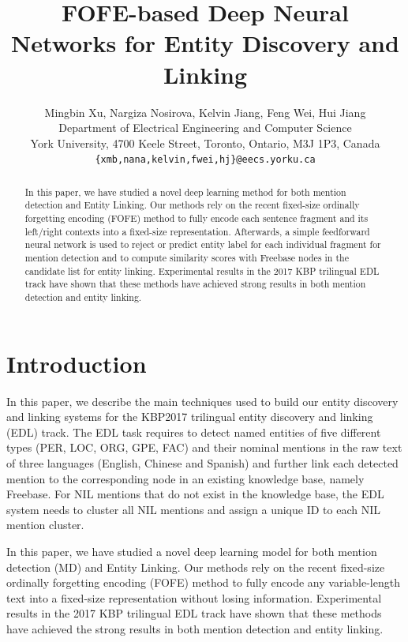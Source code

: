 \documentclass[11pt]{article}
\title{FOFE-based Deep Neural Networks for Entity Discovery and Linking}
\author{Mingbin Xu, Nargiza Nosirova, Kelvin Jiang, Feng Wei, Hui Jiang \\
	Department of Electrical Engineering and Computer Science \\
	York University,  4700 Keele Street, Toronto, Ontario, M3J 1P3, Canada\\
	{\tt \{xmb,nana,kelvin,fwei,hj\}@eecs.yorku.ca}
}
\date{}
\begin{document}
\maketitle

\begin{abstract}
In this paper, we have studied a novel deep learning method for both mention detection and Entity Linking. Our methods rely on the recent fixed-size ordinally forgetting encoding (FOFE) method to fully encode each sentence fragment and its left/right contexts into a fixed-size representation. Afterwards, a simple feedforward neural network is used to reject or predict entity label for each individual fragment for mention detection and to compute similarity scores with Freebase nodes in the candidate list for entity linking. Experimental results in the 2017 KBP trilingual EDL track have shown that these methods have achieved strong results in both mention detection and entity linking.
\end{abstract}

\section{Introduction}

In this paper, we describe the main techniques used to build our entity discovery and linking systems for the KBP2017 trilingual entity discovery and linking (EDL) track. 
The EDL task requires to detect named
entities of five different types (PER, LOC, ORG, GPE, FAC) 
and their nominal mentions in the raw text
of three languages (English, Chinese and Spanish)
and further link each detected mention to the corresponding
node in an existing knowledge base,
namely Freebase. For NIL mentions that do not exist
in the knowledge base, the EDL system needs to
cluster all NIL mentions and assign a unique ID to
each NIL mention cluster.

In this paper, we have studied a novel deep learning model for both mention detection (MD) and Entity Linking. Our methods rely on the recent fixed-size ordinally forgetting encoding (FOFE) method to fully encode any variable-length text into a fixed-size representation without losing information. 
Experimental results in the 2017 KBP trilingual EDL track have shown that these methods have achieved the strong results in both mention detection and entity linking.
\end{document}

